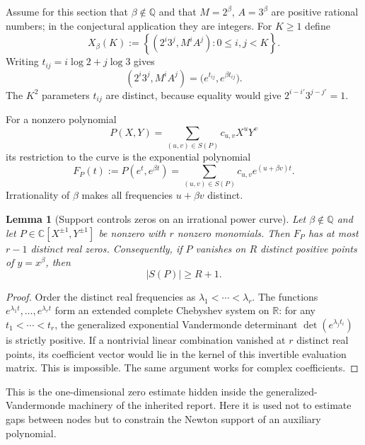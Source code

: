 \documentclass[11pt,oneside]{article}
\newtheorem{lemma}[theorem]{Lemma}
\theoremstyle{definition}
\theoremstyle{remark}
\newcommand{\Q}{\mathbb Q}
\newcommand{\R}{\mathbb R}
\newcommand{\C}{\mathbb C}
\begin{document}
Assume for this section that $\beta\notin\Q$ and that
$M=2^\beta$, $A=3^\beta$ are positive rational numbers; in the conjectural application they
are integers.  For $K\ge1$ define
\begin{equation}
 X_\beta(K):=
 \left\{
   (2^i3^j,M^iA^j):0\le i,j<K
 \right\}.
 \label{eq:mc-grid}
\end{equation}
Writing $t_{ij}=i\log2+j\log3$ gives
\begin{equation}
 (2^i3^j,M^iA^j)=\bigl(e^{t_{ij}},e^{\beta t_{ij}}\bigr).
 \label{eq:mc-grid-curve}
\end{equation}
The $K^2$ parameters $t_{ij}$ are distinct, because equality would give
$2^{i-i'}3^{j-j'}=1$.

For a nonzero polynomial
\[
 P(X,Y)=\sum_{(u,v)\in S(P)}c_{u,v}X^uY^v
\]
its restriction to the curve is the exponential polynomial
\begin{equation}
 F_P(t):=P(e^t,e^{\beta t})
 =\sum_{(u,v)\in S(P)}c_{u,v}e^{(u+\beta v)t}.
 \label{eq:mc-restriction}
\end{equation}
Irrationality of $\beta$ makes all frequencies $u+\beta v$ distinct.

\begin{lemma}[Support controls zeros on an irrational power curve]
\label{lem:support-zero-count}
Let $\beta\notin\Q$ and let $P\in\C[X^{\pm1},Y^{\pm1}]$ be nonzero with $r$ nonzero
monomials.  Then $F_P$ has at most $r-1$ distinct real zeros.  Consequently, if $P$ vanishes
on $R$ distinct positive points of $y=x^\beta$, then
\begin{equation}
 |S(P)|\ge R+1.
 \label{eq:mc-support-lower}
\end{equation}
\end{lemma}

\begin{proof}
Order the distinct real frequencies as $\lambda_1<\cdots<\lambda_r$.  The functions
$e^{\lambda_1t},\ldots,e^{\lambda_rt}$ form an extended complete Chebyshev system on
$\R$: for any $t_1<\cdots<t_r$, the generalized exponential Vandermonde determinant
$\det(e^{\lambda_jt_i})$ is strictly positive.  If a nontrivial linear combination vanished at
$r$ distinct real points, its coefficient vector would lie in the kernel of this invertible
evaluation matrix.  This is impossible.  The same argument works for complex coefficients.
\end{proof}

This is the one-dimensional zero estimate hidden inside the generalized-Vandermonde machinery
of the inherited report.  Here it is used not to estimate gaps between nodes but to constrain
the Newton support of an auxiliary polynomial.
\end{document}
